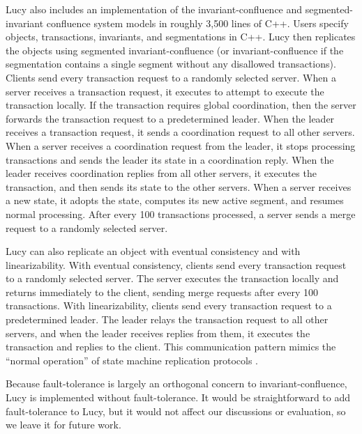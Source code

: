 Lucy also includes an implementation of the invariant-confluence and
segmented-invariant confluence system models in roughly 3,500 lines of C++.
Users specify objects, transactions, invariants, and segmentations in C++. Lucy
then replicates the objects using segmented invariant-confluence (or
invariant-confluence if the segmentation contains a single segment without any
disallowed transactions). Clients send every transaction request to a randomly
selected server. When a server receives a transaction request, it executes
 to attempt to execute the transaction locally. If the
transaction requires global coordination, then the server forwards the
transaction request to a predetermined leader. When the leader receives a
transaction request, it sends a coordination request to all other servers. When
a server receives a coordination request from the leader, it stops processing
transactions and sends the leader its state in a coordination reply. When the
leader receives coordination replies from all other servers, it executes the
transaction, and then sends its state to the other servers. When a server
receives a new state, it adopts the state, computes its new active segment, and
resumes normal processing. After every 100 transactions processed, a server
sends a merge request to a randomly selected server.

Lucy can also replicate an object with eventual consistency and with
linearizability. With eventual consistency, clients send every transaction
request to a randomly selected server. The server executes the transaction
locally and returns immediately to the client, sending merge requests after
every 100 transactions. With linearizability, clients send every transaction
request to a predetermined leader. The leader relays the transaction request to
all other servers, and when the leader receives replies from them, it executes
the transaction and replies to the client. This communication pattern mimics
the ``normal operation'' of state machine replication protocols
\cite{lamport1998part, liskov2012viewstamped}.

Because fault-tolerance is largely an orthogonal concern to
invariant-confluence, Lucy is implemented without fault-tolerance. It would be
straightforward to add fault-tolerance to Lucy, but it would not affect our
discussions or evaluation, so we leave it for future work.

